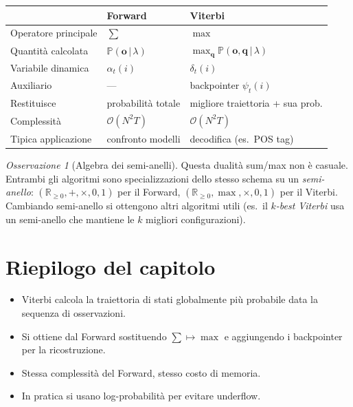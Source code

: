 \documentclass[11pt,a4paper,oneside]{book}
\theoremstyle{plain}
\theoremstyle{definition}
\theoremstyle{remark}
\newtheorem{osservazione}[teorema]{Osservazione}
\newcommand{\R}{\mathbb{R}}
\newcommand{\Prob}{\mathbb{P}}
\newcommand{\hmm}{\lambda}                   %
\newcommand{\Nstates}{N}                     %
\newcommand{\Tlen}{T}                        %
\newcommand{\seqobs}{\mathbf{o}}             %
\newcommand{\seqstates}{\mathbf{q}}          %
\newcommand{\fwd}{\alpha}                    %
\newcommand{\vit}{\delta}                    %
\newcommand{\given}{\,\vert\,}
\begin{document}
\begin{center}
\begin{tabular}{lll}
\toprule
& \textbf{Forward} & \textbf{Viterbi}\\
\midrule
Operatore principale & $\sum$ & $\max$ \\
Quantità calcolata & $\Prob(\seqobs\given\hmm)$ & $\max_{\seqstates}\Prob(\seqobs,\seqstates\given\hmm)$\\
Variabile dinamica & $\fwd_t(i)$ & $\vit_t(i)$ \\
Auxiliario & --- & backpointer $\psi_t(i)$ \\
Restituisce & probabilità totale & migliore traiettoria + sua prob.\\
Complessità & $\mathcal{O}(\Nstates^2\Tlen)$ & $\mathcal{O}(\Nstates^2\Tlen)$ \\
Tipica applicazione & confronto modelli & decodifica (es.\ POS tag)\\
\bottomrule
\end{tabular}
\end{center}

\begin{osservazione}[Algebra dei semi-anelli]
Questa dualità sum/max non è casuale. Entrambi gli algoritmi sono
specializzazioni dello stesso schema su un \emph{semi-anello}:
$(\R_{\ge 0},+,\times,0,1)$ per il Forward, $(\R_{\ge 0},\max,\times,0,1)$
per il Viterbi. Cambiando semi-anello si ottengono altri algoritmi
utili (es.\ il \emph{$k$-best Viterbi} usa un semi-anello che mantiene
le $k$ migliori configurazioni).
\end{osservazione}

\section{Riepilogo del capitolo}

\begin{itemize}[leftmargin=*]
    \item Viterbi calcola la traiettoria di stati globalmente più
          probabile data la sequenza di osservazioni.
    \item Si ottiene dal Forward sostituendo $\sum\mapsto\max$ e
          aggiungendo i backpointer per la ricostruzione.
    \item Stessa complessità del Forward, stesso costo di memoria.
    \item In pratica si usano log-probabilità per evitare underflow.
\end{itemize}
\end{document}
